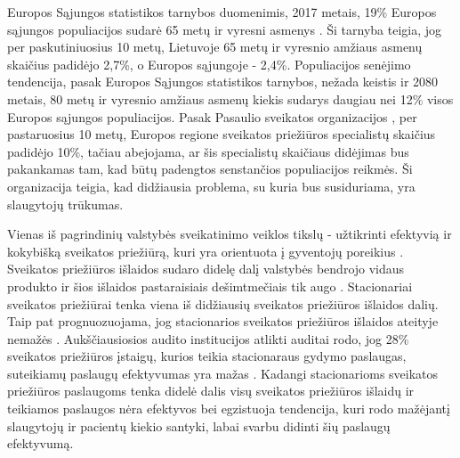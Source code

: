 
Europos Sąjungos statistikos tarnybos duomenimis, 2017 metais, 19\% Europos sąjungos populiacijos sudarė 65 metų ir vyresni asmenys \cite{Eurostat}. Ši tarnyba teigia, jog per paskutiniuosius 10 metų, Lietuvoje 65 metų ir vyresnio amžiaus asmenų skaičius padidėjo 2,7\%, o Europos sąjungoje - 2,4\%. Populiacijos senėjimo tendencija, pasak Europos Sąjungos statistikos tarnybos, nežada keistis ir 2080 metais, 80 metų ir vyresnio amžiaus asmenų kiekis sudarys daugiau nei 12\% visos Europos sąjungos populiacijos. Pasak Pasaulio sveikatos organizacijos \cite{Organization2012}, per pastaruosius 10 metų, Europos regione sveikatos priežiūros specialistų skaičius padidėjo 10\%, tačiau abejojama, ar šis specialistų skaičiaus didėjimas bus pakankamas tam, kad būtų padengtos senstančios populiacijos reikmės. Ši organizacija teigia, kad didžiausia problema, su kuria bus susiduriama, yra slaugytojų trūkumas.

Vienas iš pagrindinių valstybės sveikatinimo veiklos tikslų - užtikrinti efektyvią ir kokybišką sveikatos priežiūrą, kuri yra orientuota į gyventojų poreikius \cite{Ataskaita2018}. Sveikatos priežiūros išlaidos sudaro didelę dalį valstybės bendrojo vidaus produkto ir šios išlaidos pastaraisiais dešimtmečiais tik augo \cite{higiena}. Stacionariai sveikatos priežiūrai tenka viena iš didžiausių sveikatos priežiūros išlaidos dalių. Taip pat prognuozuojama, jog stacionarios sveikatos priežiūros išlaidos ateityje nemažės \cite{higiena}. Aukščiausiosios audito institucijos atlikti auditai rodo, jog 28\% sveikatos priežiūros įstaigų, kurios teikia stacionaraus gydymo paslaugas, suteikiamų paslaugų efektyvumas yra mažas \cite{Ataskaita2018}. Kadangi stacionarioms sveikatos priežiūros paslaugoms tenka didelė dalis visų sveikatos priežiūros išlaidų ir teikiamos paslaugos nėra efektyvos bei egzistuoja tendencija, kuri rodo mažėjantį slaugytojų ir pacientų kiekio santyki, labai svarbu didinti šių paslaugų efektyvumą.

